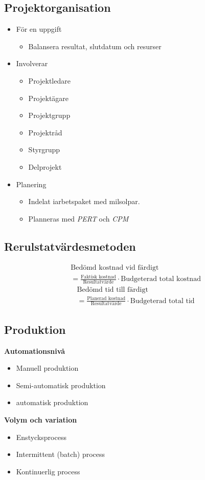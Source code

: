 \begin{multicols}{2}
\subsection{Projektorganisation}
\begin{itemize}
    \item För en uppgift
    \begin{itemize}
        \item Balansera resultat, slutdatum och resurser
    \end{itemize}
    \item Involverar
    \begin{itemize}
        \item Projektledare
        \item Projektägare
        \item Projektgrupp
        \item Projektråd 
        \item Styrgrupp
        \item Delprojekt
    \end{itemize}
    \item Planering
    \begin{itemize}
        \item Indelat iarbetspaket med milsolpar.
        \item Planneras med \textit{PERT} och \textit{CPM} %
    \end{itemize}
\end{itemize}

\subsection{Rerulstatvärdesmetoden}
\begin{align*}
    &\text{Bedömd kostnad vid färdigt} \\
    &= \frac{\text{Faktisk kostnad}}{\text{Resultatvärde}} 
    \cdot \text{Budgeterad total kostnad}
\end{align*}
\begin{align*}
    &\text{Bedömd tid till färdigt} \\
    &= \frac{\text{Planerad kostnad}}{\text{Resultatvärde}} 
    \cdot \text{Budgeterad total tid}
\end{align*}

\subsection{Produktion}
\textbf{Automationsnivå}
\begin{itemize}
    \item Manuell produktion
    \item Semi-automatisk produktion
    \item automatisk produktion
\end{itemize}
\textbf{Volym och variation}
\begin{itemize}
    \item Enstycksprocess
    \item Intermittent (batch) process 
    \item Kontinuerlig process
\end{itemize}


\end{multicols}
